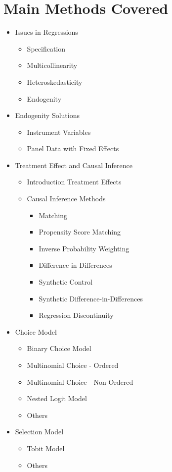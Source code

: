 \documentclass[12pt, a4paper]{article}
\begin{document}
\section{Main Methods Covered}
    \begin{itemize}
        \item Issues in Regressions
        \begin{itemize}
            \item Specification
            \item Multicollinearity
            \item Heteroskedasticity
            \item Endogenity
        \end{itemize}
        \item Endogenity Solutions
        \begin{itemize}
            \item Instrument Variables
            \item Panel Data with Fixed Effects
        \end{itemize}
    \item Treatment Effect and Causal Inference
    \begin{itemize}
        \item Introduction Treatment Effects
        \item Causal Inference Methods
        \begin{itemize}
            \item Matching
            \item Propensity Score Matching
            \item Inverse Probability Weighting
            \item Difference-in-Differences
            \item Synthetic Control
            \item Synthetic Difference-in-Differences
            \item Regression Discontinuity
        \end{itemize}
    \end{itemize}

    \item Choice Model
    \begin{itemize}
        \item Binary Choice Model
        \item Multinomial Choice - Ordered
        \item Multinomial Choice - Non-Ordered
        \item Nested Logit Model
        \item Others
    \end{itemize}

    \item Selection Model
    \begin{itemize}
        \item Tobit Model
        \item Others
    \end{itemize}

\end{itemize}
\end{document}
